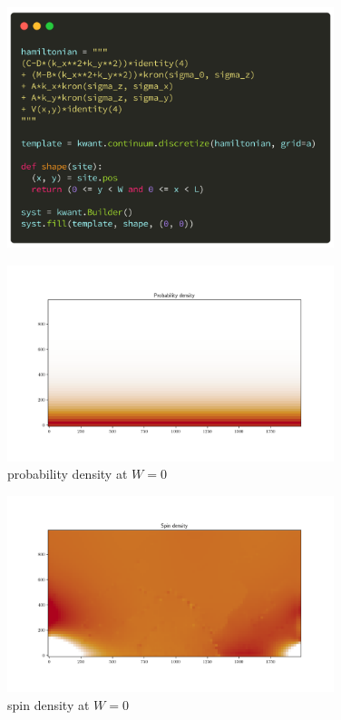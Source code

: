 \documentclass[12pt]{article}
\numberwithin{equation}{section}
\begin{document}
\newpage
\begin{figure}[h!]
  \begin{center}
  \includegraphics[width=0.85\textwidth]{./media/hamilton_def.png}
  \end{center}
\end{figure}

\newpage
\begin{figure}[h!]
  \begin{center}
  \includegraphics[width=0.85\textwidth]{./media/proba_dens_W=0.png}
  \caption{probability density at $W=0$}
  \end{center}
\end{figure}

\begin{figure}[h!]
  \begin{center}
  \includegraphics[width=0.85\textwidth]{./media/spin_dens_W=0.png}
  \caption{spin density at $W=0$}
  \end{center}
\end{figure}
\end{document}
